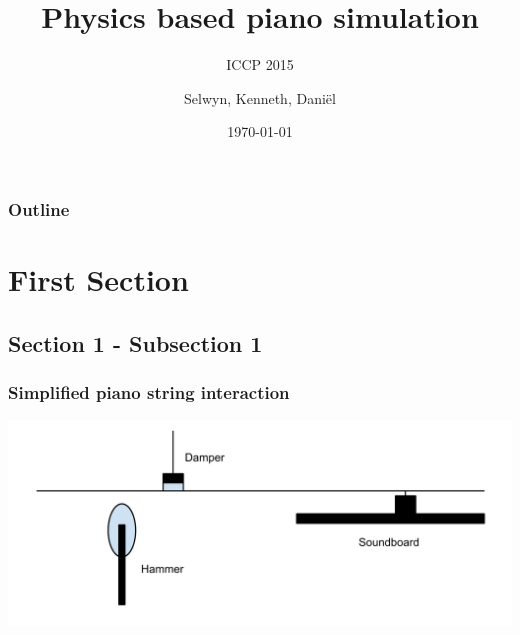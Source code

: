 \documentclass{beamer}
\title[Physics based piano simulation]{Physics based piano simulation}
\subtitle{\normalsize{ICCP 2015}}
\institute[TU Delft]{Delft University of Technology}
\author{Selwyn, Kenneth, Dani\"{e}l}
\date{\today}
\newcommand*\titleTOC{Outline}
\begin{document}
{
%
\frame{\titlepage}
}

{
\begin{frame}\frametitle{\titleTOC}
	\tableofcontents
\end{frame}
}

\section{First Section}
\subsection{Section 1 - Subsection 1}

\begin{frame}\frametitle{Simplified piano string interaction}
	
		\begin{minipage}{1\textwidth}
			\includegraphics[width=\textwidth]{images/string.pdf}
		\end{minipage}
\end{frame}
\end{document}
